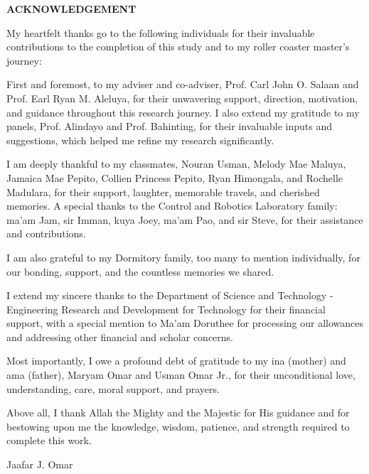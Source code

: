 
\begin{center}
	\noindent \textbf{ACKNOWLEDGEMENT}
\end{center}

My heartfelt thanks go to the following individuals for their invaluable contributions to the completion of this study and to my roller coaster master's journey:

First and foremost, to my adviser and co-adviser, Prof. Carl John O. Salaan and Prof. Earl Ryan M. Aleluya, for their unwavering support, direction, motivation, and guidance throughout this research journey. I also extend my gratitude to my panels, Prof. Alindayo and Prof. Bahinting, for their invaluable inputs and suggestions, which helped me refine my research significantly.

I am deeply thankful to my classmates, Nouran Usman, Melody Mae Maluya, Jamaica Mae Pepito, Collien Princess Pepito, Ryan Himongala, and Rochelle Madulara, for their support, laughter, memorable travels, and cherished memories. A special thanks to the Control and Robotics Laboratory family: ma'am Jam, sir Imman, kuya Joey, ma'am Pao, and sir Steve, for their assistance and contributions.

I am also grateful to my Dormitory family, too many to mention individually, for our bonding, support, and the countless memories we shared.

I extend my sincere thanks to the Department of Science and Technology - Engineering Research and Development for Technology for their financial support, with a special mention to Ma'am Doruthee for processing our allowances and addressing other financial and scholar concerns.

Most importantly, I owe a profound debt of gratitude to my ina (mother) and ama (father), Maryam Omar and Usman Omar Jr., for their unconditional love, understanding, care, moral support, and prayers.

Above all, I thank Allah the Mighty and the Majestic for His guidance and for bestowing upon me the knowledge, wisdom, patience, and strength required to complete this work.

\vspace{0.5cm}

\begin{flushright}
	Jaafar J. Omar
\end{flushright}

\vspace{0.5cm}